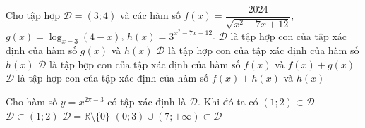 \begin{ex}%
 Cho tập hợp $\mathscr D=(3;4)$  và các hàm số $f(x)=\dfrac{2024}{\sqrt{x^2-7x+12}}$, $g(x)=\log_{x-3}(4-x)$, $h(x)=3^{x^2-7x+12}$.
  \choiceTF
  {\True $\mathscr D$ là tập hợp  con của tập xác định của hàm số $g(x)$ và $h(x)$}
  {\True $\mathscr  D$ là tập hợp con của tập xác định của hàm số $h(x)$}
  {$\mathscr D$ là tập hợp con  của tập xác định của hàm số $f(x)$ và $f(x)+g(x)$}
  {$\mathscr D$ là tập hợp con  của tập xác định của hàm số $f(x)+h(x)$ và $h(x)$}
\end{ex}

\begin{ex}%
 Cho hàm số $y=x^{2\pi -3}$ có tập xác định  là $\mathscr D$. Khi đó ta có
  \choiceTF
  {\True $(1;2)\subset\mathscr  D$}
  {$\mathscr D\subset  (1;2)$}
  {$\mathscr D=\mathbb{R}\setminus\{0\}$} 
   {\True $(0;3)\cup (7;+\infty)\subset\mathscr D$}
\end{ex}

